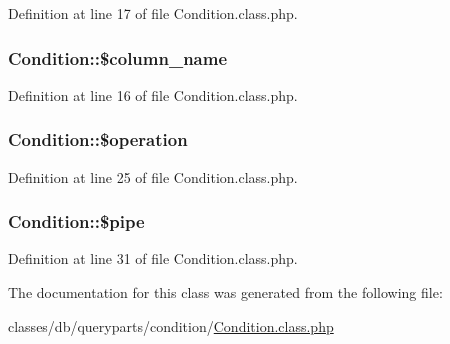 Definition at line 17 of file Condition.\+class.\+php.

\subsubsection[{\texorpdfstring{\$column\+\_\+name}{$column_name}}]{\setlength{\rightskip}{0pt plus 5cm}Condition\+::\$column\+\_\+name}\hypertarget{classCondition_ae34f9b605299c7142f5c9daa61b338fe}{}\label{classCondition_ae34f9b605299c7142f5c9daa61b338fe}


Definition at line 16 of file Condition.\+class.\+php.

\subsubsection[{\texorpdfstring{\$operation}{$operation}}]{\setlength{\rightskip}{0pt plus 5cm}Condition\+::\$operation}\hypertarget{classCondition_aa8fbf3bdbbea0c57d3822ac585eb75a4}{}\label{classCondition_aa8fbf3bdbbea0c57d3822ac585eb75a4}


Definition at line 25 of file Condition.\+class.\+php.

\subsubsection[{\texorpdfstring{\$pipe}{$pipe}}]{\setlength{\rightskip}{0pt plus 5cm}Condition\+::\$pipe}\hypertarget{classCondition_a19b2472b462fc19e44b8fcbf1898b9cc}{}\label{classCondition_a19b2472b462fc19e44b8fcbf1898b9cc}


Definition at line 31 of file Condition.\+class.\+php.



The documentation for this class was generated from the following file\+:\begin{DoxyCompactItemize}
\item 
classes/db/queryparts/condition/\hyperlink{Condition_8class_8php}{Condition.\+class.\+php}\end{DoxyCompactItemize}
